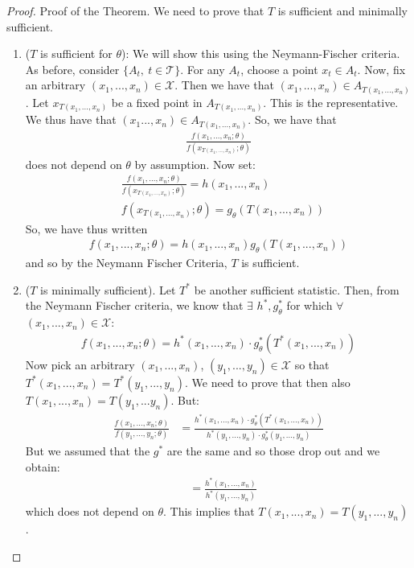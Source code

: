 \documentclass[11pt]{scrartcl}
\theoremstyle{definition}
\theoremstyle{remark}
\begin{document}
{ \begin{proof}
 	Proof of the Theorem. We need to prove that $T$ is sufficient and minimally sufficient. 
 	\begin{enumerate}[noitemsep]
 		\item ($T$ is sufficient for $\theta$): We will show this using the Neymann-Fischer criteria. 
 		As before, consider $\{ A_t,\ t \in \mathcal{T} \}$. For any $A_t$, choose a point $x_t \in A_t$. Now, fix an arbitrary $(x_1, ..., x_n) \in \mathcal{X}$. Then we have that $(x_1, ..., x_n) \in A_{T(x_1, ..., x_n)}$. Let $x_{T(x_1, ..., x_n)}$ be a fixed point in $A_{T(x_1,..., x_n)}$. This is the representative. We thus have that $(x_1 ..., x_n) \in A_{T(x_1,...,x_n)}$. So, we have that 
 		\begin{align*}
 			\frac{f(x_1, ..., x_n; \theta)}{f(x_{T(x_1, ..., x_n)}; \theta)}
 		\end{align*}
 		does not depend on $\theta$ by assumption. Now set: 
 		\begin{align*}
 				& \frac{ f(x_1, ..., x_n; \theta)}{f(x_{T(x_1, ..., x_n)}; \theta)} = h(x_1, ..., x_n) \\
 				& f(x_{T(x_1, ..., x_n)}; \theta) = g_\theta (T(x_1, ..., x_n)) 
 		\end{align*}
 		So, we have thus written
 		\begin{align*}
 			f(x_1, ..., x_n; \theta) = h(x_1, ..., x_n) g_\theta (T(x_1, ..., x_n)) 
 		\end{align*}
 		and so by the Neymann Fischer Criteria, $T$ is sufficient. 
 		\item ($T$ is minimally sufficient). 
 		Let $T^*$ be another sufficient statistic. Then, from the Neymann Fischer criteria, we know that $\exists$ $h^*, g_\theta^*$ for which $\forall$ $(x_1, ..., x_n) \in \mathcal{X}$: 
 		\begin{align*}
 			f(x_1, ..., x_n; \theta) = h^*(x_1, ..., x_n) \cdot g_\theta^* (T^*(x_1, ..., x_n)) 
 		\end{align*}
 		Now pick an arbitrary $(x_1, ..., x_n)$, $(y_1, ..., y_n) \in \mathcal{X}$ so that $T^*(x_1, ..., x_n) = T^*(y_1, ..., y_n)$. We need to prove that then also $T(x_1, ..., x_n) = T(y_1, ... y_n)$. But: 
 		\begin{align*}
 			\frac{f(x_1, ..., x_n; \theta)}{f(y_1, ..., y_n; \theta)} & = \frac{h^*(x_1, ..., x_n) \cdot g_\theta^* (T^*(x_1, ...,x_n))}{h^*(y_1, ..., y_n) \cdot g_\theta^* (y_1, ..., y_n)}
 		\end{align*}
 		But we assumed that the $g^*$ are the same and so those drop out and we obtain: 
 		\begin{align*}
 			& = \frac{h^*(x_1, ..., x_n)}{h^*(y_1, ..., y_n)}
 		\end{align*}
 		which does not depend on $\theta$. This implies that $T(x_1, ..., x_n) = T(y_1, ..., y_n)$. 
 	\end{enumerate}
 \end{proof}
 
}
\end{document}
